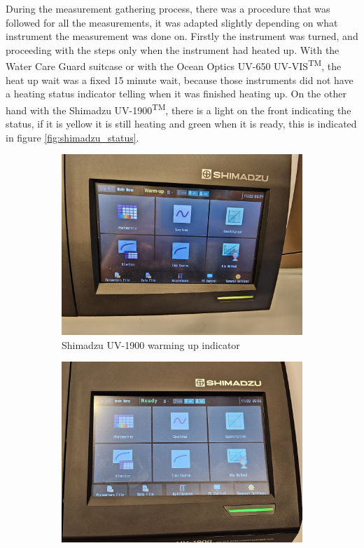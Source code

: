 \documentclass{article}
\begin{document}
During the measurement gathering process, there was a procedure that was followed for all the measurements, it was adapted slightly depending on what instrument the measurement was done on.
Firstly the instrument was turned, and proceeding with the steps only when the instrument had heated up.
With the Water Care Guard suitcase or with the Ocean Optics UV-650 UV-VIS\textsuperscript{TM}, the heat up wait was a fixed 15 minute wait, because those instruments did not have a heating status indicator telling when it was finished heating up.
On the other hand with the Shimadzu UV-1900\textsuperscript{TM}, there is a light on the front indicating the status, if it is yellow it is still heating and green when it is ready, this is indicated in figure \ref{fig:shimadzu_status}.

\begin{figure}[H]
    \centering
    \begin{subfigure}[b]{0.48\textwidth}
        \centering
        \includegraphics[width=\textwidth]{shimadzu_heating.jpg}
        \caption{Shimadzu UV-1900 warming up indicator}
        \label{fig:shimadzu_heating}
    \end{subfigure}
    \hfill
    \begin{subfigure}[b]{0.48\textwidth}
       \centering 
       \includegraphics[width=\textwidth]{shimadzu_ready.jpg}

\end{subfigure}
\end{figure}
\end{document}
